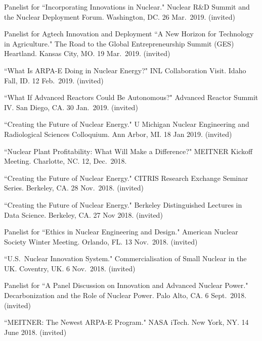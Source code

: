 \begin{bibsection}
\item Panelist for ``Incorporating Innovations in Nuclear." Nuclear R\&D Summit and the Nuclear Deployment Forum. Washington, DC. 26 Mar.\ 2019. (invited)

\item Panelist for Agtech Innovation and Deployment ``A New Horizon for Technology in Agriculture." The Road to the Global Entrepreneurship Summit (GES) Heartland. Kansas City, MO. 19 Mar.\ 2019. (invited)

\item ``What Is ARPA-E Doing in Nuclear Energy?" INL Collaboration Visit. Idaho Fall, ID. 12 Feb.\ 2019. (invited)

\item ``What If  Advanced Reactors Could Be Autonomous?" Advanced Reactor Summit IV. San Diego, CA. 30 Jan.\ 2019. (invited)

\item ``Creating the Future of Nuclear Energy." U Michigan Nuclear Engineering and Radiological Sciences Colloquium. Ann Arbor, MI. 18 Jan 2019. (invited)

\item  ``Nuclear Plant Profitability: What Will Make a Difference?" MEITNER Kickoff Meeting. Charlotte, NC. 12, Dec.\ 2018.

\item ``Creating the Future of Nuclear Energy." CITRIS Research Exchange Seminar Series. Berkeley, CA. 28 Nov.\ 2018. (invited)

\item ``Creating the Future of Nuclear Energy." Berkeley Distinguished Lectures in Data Science. Berkeley, CA. 27 Nov 2018. (invited)

\item Panelist for ``Ethics in Nuclear Engineering and Design."
American Nuclear Society Winter Meeting. Orlando, FL. 13 Nov.\ 2018. (invited)

\item ``U.S.\ Nuclear Innovation System." Commercialisation of Small Nuclear in the UK. Coventry, UK. 6 Nov.\ 2018. (invited)

\item Panelist for ``A Panel Discussion on Innovation and Advanced Nuclear Power." Decarbonization and the Role of Nuclear Power. Palo Alto, CA. 6 Sept.\ 2018. (invited)

\item ``MEITNER: The Newest ARPA-E Program." NASA iTech. New York, NY. 14 June 2018. (invited)


\end{bibsection}
